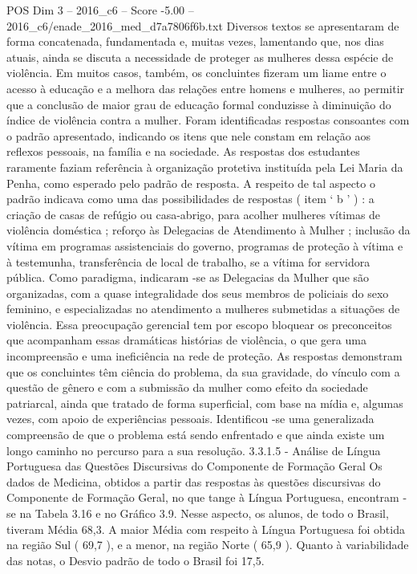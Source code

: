 \begin{textsample}{POS Dim 3 – 2016\_c6 – Score -5.00 – 2016\_c6/enade\_2016\_med\_d7a7806f6b.txt}
Diversos textos se apresentaram de forma concatenada, fundamentada e, muitas vezes, lamentando que, nos dias atuais, ainda se discuta a necessidade de proteger as mulheres dessa espécie de violência.
Em muitos casos, também, os concluintes fizeram um liame entre o acesso à educação e a melhora das relações entre homens e mulheres, ao permitir que a conclusão de maior grau de educação formal conduzisse à diminuição do índice de violência contra a mulher.
Foram identificadas respostas consoantes com o padrão apresentado, indicando os itens que nele constam em relação aos reflexos pessoais, na família e na sociedade.
As respostas dos estudantes raramente faziam referência à organização protetiva instituída pela Lei Maria da Penha, como esperado pelo padrão de resposta.
A respeito de tal aspecto o padrão indicava como uma das possibilidades de respostas ( item ‘ b ’ ) : a criação de casas de refúgio ou casa-abrigo, para acolher mulheres vítimas de violência doméstica ; reforço às Delegacias de Atendimento à Mulher ; inclusão da vítima em programas assistenciais do governo, programas de proteção à vítima e à testemunha, transferência de local de trabalho, se a vítima for servidora pública.
Como paradigma, indicaram -se as Delegacias da Mulher que são organizadas, com a quase integralidade dos seus membros de policiais do sexo feminino, e especializadas no atendimento a mulheres submetidas a situações de violência.
Essa preocupação gerencial tem por escopo bloquear os preconceitos que acompanham essas dramáticas histórias de violência, o que gera uma incompreensão e uma ineficiência na rede de proteção.
As respostas demonstram que os concluintes têm ciência do problema, da sua gravidade, do vínculo com a questão de gênero e com a submissão da mulher como efeito da sociedade patriarcal, ainda que tratado de forma superficial, com base na mídia e, algumas vezes, com apoio de experiências pessoais.
Identificou -se uma generalizada compreensão de que o problema está sendo enfrentado e que ainda existe um longo caminho no percurso para a sua resolução. 3.3.1.5 - Análise de Língua Portuguesa das Questões Discursivas do Componente de Formação Geral Os dados de Medicina, obtidos a partir das respostas às questões discursivas do Componente de Formação Geral, no que tange à Língua Portuguesa, encontram -se na Tabela 3.16 e no Gráfico 3.9.
Nesse aspecto, os alunos, de todo o Brasil, tiveram Média 68,3.
A maior Média com respeito à Língua Portuguesa foi obtida na região Sul ( 69,7 ), e a menor, na região Norte ( 65,9 ).
Quanto à variabilidade das notas, o Desvio padrão de todo o Brasil foi 17,5.

\end{textsample}
